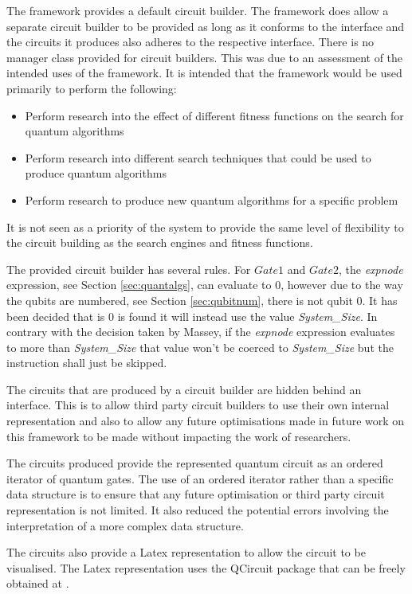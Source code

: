 The framework provides a default circuit builder.
The framework does allow a separate circuit builder to be provided as long as it conforms to the interface and the circuits it produces also adheres to the respective interface.
There is no manager class provided for circuit builders.
This was due to an assessment of the intended uses of the framework.
It is intended that the framework would be used primarily to perform the following:
\begin{itemize}
  \item Perform research into the effect of different fitness functions on the search for quantum algorithms
  \item Perform research into different search techniques that could be used to produce quantum algorithms
  \item Perform research to produce new quantum algorithms for a specific problem
\end{itemize}

It is not seen as a priority of the system to provide the same level of flexibility to the circuit building as the search engines and fitness functions.

The provided circuit builder has several rules.
For $Gate1$ and $Gate2$, the \emph{expnode} expression, see Section \ref{sec:quantalgs}, can evaluate to $0$, however due to the way the qubits are numbered, see Section \ref{sec:qubitnum}, there is not qubit $0$.
It has been decided that is $0$ is found it will instead use the value \emph{System\_Size}.
In contrary with the decision taken by Massey\cite{masseythesis}, if the \emph{expnode} expression evaluates to more than \emph{System\_Size} that value won't be coerced to \emph{System\_Size} but the instruction shall just be skipped.

The circuits that are produced by a circuit builder are hidden behind an interface.
This is to allow third party circuit builders to use their own internal representation and also to allow any future optimisations made in future work on this framework to be made without impacting the work of researchers.

The circuits produced provide the represented quantum circuit as an ordered iterator of quantum gates.
The use of an ordered iterator rather than a specific data structure is to ensure that any future optimisation or third party circuit representation is not limited.
It also reduced the potential errors involving the interpretation of a more complex data structure.

The circuits also provide a Latex representation to allow the circuit to be visualised.
The Latex representation uses the QCircuit package that can be freely obtained at \cite{QCsite}.

